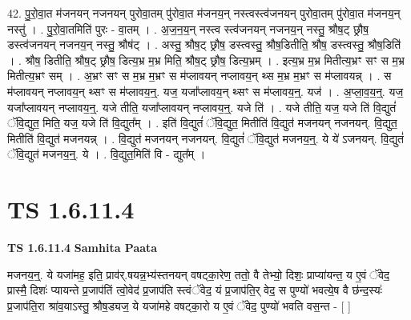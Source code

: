 \documentclass[17pt]{extarticle}
\begin{document}
42. पु॒रो॒वा॒त म॑जनयन् नजनयन् पुरोवा॒तम् पु॑रोवा॒त म॑जनय॒न् नस्त्वस्त्व॑जनयन् पुरोवा॒तम् पु॑रोवा॒त म॑जनय॒न् नस्तु॑ । . पु॒रो॒वा॒तमिति॑ पुरः - वा॒तम् । . अ॒ज॒न॒य॒न् नस्त्व स्त्व॑जनयन् नजनय॒न् नस्तु॒ श्रौष॒ट् छ्रौष॒ डस्त्व॑जनयन् नजनय॒न् नस्तु॒ श्रौष॑ट् । . अस्तु॒ श्रौष॒ट् छ्रौष॒ डस्त्वस्तु॒ श्रौष॒डितीति॒ श्रौष॒ डस्त्वस्तु॒ श्रौष॒डिति॑ । . श्रौष॒ डितीति॒ श्रौष॒ट् छ्रौष॒ डित्य॒भ्र म॒भ्र मिति॒ श्रौष॒ट् छ्रौष॒ डित्य॒भ्रम् । . इत्य॒भ्र म॒भ्र मितीत्य॒भ्रꣳ सꣳ स म॒भ्र मितीत्य॒भ्रꣳ सम् । . अ॒भ्रꣳ सꣳ स म॒भ्र म॒भ्रꣳ स म॑प्लावयन् नप्लावय॒न् थ्स म॒भ्र म॒भ्रꣳ स म॑प्लावयन्न् । . स म॑प्लावयन् नप्लावय॒न् थ्सꣳ स म॑प्लावय॒न्॒. यज॒ यजा᳚प्लावय॒न् थ्सꣳ स म॑प्लावय॒न्॒. यज॑ । . अ॒प्ला॒व॒य॒न्॒. यज॒ यजा᳚प्लावयन् नप्लावय॒न्॒. यजे तीति॒ यजा᳚प्लावयन् नप्लावय॒न्॒. यजे ति॑ । . यजे तीति॒ यज॒ यजे ति॑ वि॒द्युतं॑ ॅवि॒द्युत॒ मिति॒ यज॒ यजे ति॑ वि॒द्युत᳚म् । . इति॑ वि॒द्युतं॑ ॅवि॒द्युत॒ मितीति॑ वि॒द्युत॑ मजनयन् नजनयन्. वि॒द्युत॒ मितीति॑ वि॒द्युत॑ मजनयन्न् । . वि॒द्युत॑ मजनयन् नजनयन्. वि॒द्युतं॑ ॅवि॒द्युत॑ मजनय॒न्॒. ये ये॑ ऽजनयन्. वि॒द्युतं॑ ॅवि॒द्युत॑ मजनय॒न्॒. ये । . वि॒द्युत॒मिति॑ वि - द्युत᳚म् । \newline
\pagebreak
{}
\section*{ TS 1.6.11.4 }

\textbf{TS 1.6.11.4 } \newline
\textbf{Samhita Paata} \newline

मजनय॒न्॒. ये यजा॑मह॒ इति॒ प्राव॑र्.षयन्न॒भ्य॑स्तनयन् वषट्का॒रेण॒ ततो॒ वै तेभ्यो॒ दिशः॒ प्राप्या॑यन्त॒ य ए॒वं ॅवेद॒ प्रास्मै॒ दिशः॑ प्यायन्ते प्र॒जाप॑तिं त्वो॒वेद॑ प्र॒जाप॑ति स्त्वंॅवेद॒ यं प्र॒जाप॑ति॒र् वेद॒ स पुण्यो॑ भवत्ये॒ष वै छ॑न्द॒स्यः॑ प्र॒जाप॑ति॒रा श्रा॑व॒याऽस्तु॒ श्रौष॒ड्यज॒ ये यजा॑महे वषट्का॒रो य ए॒वं ॅवेद॒ पुण्यो॑ भवति वस॒न्त - [ ] \newline
\end{document}
